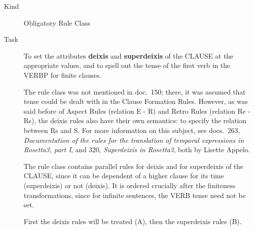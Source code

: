 \begin{description}
\item[Kind] Obligatory Rule Class
\item[Task] To set 
the attributes {\bf deixis} and {\bf superdeixis} of the CLAUSE at the 
appropriate values, and
to spell out the tense of the first verb in the VERBP for finite clauses. 

The rule class was not mentioned in doc.\ 150; there, it was assumed that tense 
could be dealt with in the Clause Formation Rules. However, as was said before 
of Aspect Rules (relation E - R) and Retro Rules (relation Re - Rs), the 
deixis rules also have their own semantics: to specify the relation between Rs 
and S. For more information on this subject,
see docs.\ 263, {\em Documentation of the rules 
for the translation of temporal expressions in Rosetta3, part I\/}, and 320, 
{\em Superdeixis in Rosetta3\/}, both by Lisette Appelo.

The rule class contains parallel rules for deixis and for superdeixis of the 
CLAUSE, since it can be dependent  
of a higher clause for its time (superdeixis) or not (deixis).
It is ordered crucially after the finiteness transformations, since for 
infinite sentences, the VERB tense need not be set.

First the deixis rules will be treated (A), then the superdeixis rules (B).

\vspace{1 cm}

\end{description}
